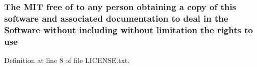 \hypertarget{LICENSE_8txt_ab8202310c90e99c59d9ea1f58f920a91}{
\subsubsection[{use}]{\setlength{\rightskip}{0pt plus 5cm}The M\-I\-T free of to any person obtaining a {\bf copy} of this software and associated documentation to deal in the {\bf Software} without including without limitation the rights to use}}\label{LICENSE_8txt_ab8202310c90e99c59d9ea1f58f920a91}


Definition at line 8 of file L\-I\-C\-E\-N\-S\-E.\-txt.

